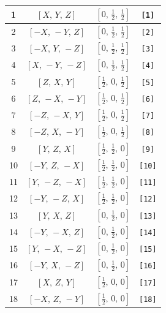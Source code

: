 \documentclass[fleqn,8pt]{jsarticle}
\begin{document}
\begin{longtable}{cccc}
1 & $\left[ X,\, Y,\, Z \right]$ & $\left[ 0,\, \frac{1}{2},\, \frac{1}{2} \right]$ & {\tt [1]} \\ \hline
2 & $\left[ - X,\, - Y,\, Z \right]$ & $\left[ 0,\, \frac{1}{2},\, \frac{1}{2} \right]$ & {\tt [2]} \\ \hline
3 & $\left[ - X,\, Y,\, - Z \right]$ & $\left[ 0,\, \frac{1}{2},\, \frac{1}{2} \right]$ & {\tt [3]} \\ \hline
4 & $\left[ X,\, - Y,\, - Z \right]$ & $\left[ 0,\, \frac{1}{2},\, \frac{1}{2} \right]$ & {\tt [4]} \\ \hline
5 & $\left[ Z,\, X,\, Y \right]$ & $\left[ \frac{1}{2},\, 0,\, \frac{1}{2} \right]$ & {\tt [5]} \\ \hline
6 & $\left[ Z,\, - X,\, - Y \right]$ & $\left[ \frac{1}{2},\, 0,\, \frac{1}{2} \right]$ & {\tt [6]} \\ \hline
7 & $\left[ - Z,\, - X,\, Y \right]$ & $\left[ \frac{1}{2},\, 0,\, \frac{1}{2} \right]$ & {\tt [7]} \\ \hline
8 & $\left[ - Z,\, X,\, - Y \right]$ & $\left[ \frac{1}{2},\, 0,\, \frac{1}{2} \right]$ & {\tt [8]} \\ \hline
9 & $\left[ Y,\, Z,\, X \right]$ & $\left[ \frac{1}{2},\, \frac{1}{2},\, 0 \right]$ & {\tt [9]} \\ \hline
10 & $\left[ - Y,\, Z,\, - X \right]$ & $\left[ \frac{1}{2},\, \frac{1}{2},\, 0 \right]$ & {\tt [10]} \\ \hline
11 & $\left[ Y,\, - Z,\, - X \right]$ & $\left[ \frac{1}{2},\, \frac{1}{2},\, 0 \right]$ & {\tt [11]} \\ \hline
12 & $\left[ - Y,\, - Z,\, X \right]$ & $\left[ \frac{1}{2},\, \frac{1}{2},\, 0 \right]$ & {\tt [12]} \\ \hline
13 & $\left[ Y,\, X,\, Z \right]$ & $\left[ 0,\, \frac{1}{2},\, 0 \right]$ & {\tt [13]} \\ \hline
14 & $\left[ - Y,\, - X,\, Z \right]$ & $\left[ 0,\, \frac{1}{2},\, 0 \right]$ & {\tt [14]} \\ \hline
15 & $\left[ Y,\, - X,\, - Z \right]$ & $\left[ 0,\, \frac{1}{2},\, 0 \right]$ & {\tt [15]} \\ \hline
16 & $\left[ - Y,\, X,\, - Z \right]$ & $\left[ 0,\, \frac{1}{2},\, 0 \right]$ & {\tt [16]} \\ \hline
17 & $\left[ X,\, Z,\, Y \right]$ & $\left[ \frac{1}{2},\, 0,\, 0 \right]$ & {\tt [17]} \\ \hline
18 & $\left[ - X,\, Z,\, - Y \right]$ & $\left[ \frac{1}{2},\, 0,\, 0 \right]$ & {\tt [18]} \\ \hline

\end{longtable}
\end{document}
